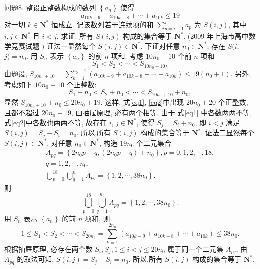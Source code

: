 问题8. 整设正整数构成的数列 $\left\{a_n\right\}$ 使得
$$
a_{10 k-9}+a_{10 k-8}+\cdots+a_{10 k} \leqslant 19
$$
对一切 $k \in \mathbf{N}^*$ 恒成立.
记该数列若干连续项的和 $\sum_{p=i+1}^j a_p$ 为 $S(i, j)$, 其中 $i, j \in \mathbf{N}^*$ 且 $i<j$. 求证: 所有 $S(i, j)$ 构成的集合等于 $\mathbf{N}^*$. (2009 年上海市高中数学竞赛试题 $)$
证法一显然每个 $S(i, j) \in \mathbf{N}^*$. 下证对任意 $n_0 \in \mathbf{N}^*$, 存在 $S(i$, $j)=n_0$.
用 $S_n$ 表示 $\left\{a_n\right\}$ 的前 $n$ 项和.
考虑 $10 n_0+10$ 个前 $n$ 项和
$$
S_1<S_2<\cdots<S_{10 n_0+10}, \label{eq1}
$$
由题设, $S_{10 n_0+10}=\sum_{k=1}^{n_0+1}\left(a_{10 k-9}+a_{10 k-8}+\cdots+a_{10 k}\right) \leqslant 19\left(n_0+1\right)$.
另外, 考虑如下 $10 n_0+10$ 个正整数:
$$
S_1+n_0<S_2+n_0<\cdots<S_{10 n_0+10}+n_0, \label{eq2}
$$
显然 $S_{10 n_0+10}+n_0 \leqslant 20 n_0+19$.
这样, 式\ref{eq1}, \ref{eq2}中出现 $20 n_0+20$ 个正整数, 且都不超过 $20 n_0+19$, 由抽屉原理, 必有两个相等.
由于 式\ref{eq1} 中各数两两不等, 式\ref{eq2}中各数也两两不等, 故存在 $i$, $j \in \mathbf{N}^*$, 使得 $S_j=S_i+n_0$, 即 $i<j$ 满足 $S(i, j)=S_j-S_i=n_0$.
所以,所有 $S(i, j)$ 构成的集合等于 $\mathbf{N}^*$.
证法二显然每个 $S(i, j) \in \mathbf{N}^*$. 对任意 $n_0 \in \mathbf{N}^*$, 构造 $19 n_0$ 个二元集合
$$
\begin{gathered}
A_{p q}=\left\{2 n_0 p+q,\left(2 n_0 p+q\right)+n_0\right\}, p=0,1,2, \cdots, 18, \\
q=1,2, \cdots, n_0, \\
\bigcup_{p=0}^{18} \bigcup_{q=1}^{n_0} A_{p q}=\left\{1,2, \cdots, 38 n_0\right\} .
\end{gathered}
$$
则
$$
\bigcup_{p=0}^{18} \bigcup_{q=1}^{n_0} A_{p q}=\left\{1,2, \cdots, 38 n_0\right\} .
$$
用 $S_n$ 表示 $\left\{a_n\right\}$ 的前 $n$ 项和, 则
$$
1 \leqslant S_1<S_2<\cdots<S_{20 n_0}=\sum_{k=1}^{2 n_0}\left(a_{10 k-9}+a_{10 k-8}+\cdots+a_{10 k}\right) \leqslant 38 n_0 .
$$
根据抽屉原理, 必存在两个数 $S_i, S_j, 1 \leqslant i<j \leqslant 20 n_0$ 属于同一个二元集 $A_{p q}$, 由 $A_{p q}$ 的取法可知, $S(i, j)=S_j-S_i=n_0$.
所以,所有 $S(i, j)$ 构成的集合等于 $\mathbf{N}^*$.



